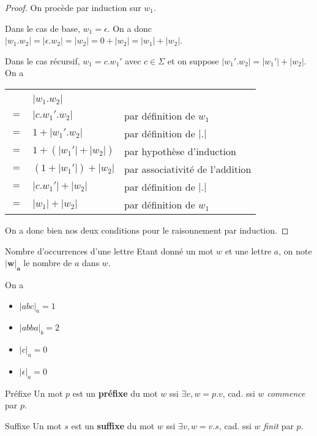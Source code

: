 \begin{proof}
On procède par induction sur $w_1$.

Dans le cas de base, $w_1 = \epsilon$. On a donc $|w_1.w_2| = |\epsilon.w_2| = |w_2| = 0 + |w_2| = |w_1| + |w_2|$.

Dans le cas récursif, $w_1 = c.w_1'$ avec $c \in \Sigma$ et on suppose $|w_1'.w_2| = |w_1'| + |w_2|$. On a
\begin{tabular}{cll}
&&\\
& $|w_1.w_2|$ & \\
$=$ & $|c.w_1'.w_2|$ & par définition de $w_1$ \\
$=$&  $1 + |w_1'.w_2|$ & par définition de $|.|$ \\
$=$& $1 + (|w_1'| + |w_2|)$ & par hypothèse d'induction \\
$=$& $(1 + |w_1'|) + |w_2|$ & par associativité de l'addition \\
$=$& $|c.w_1'| + |w_2|$ & par définition de $|.|$ \\
$=$& $|w_1| + |w_2|$ & par définition de $w_1$
\end{tabular}

On a donc bien nos deux conditions pour le raisonnement par induction.
\end{proof}


\begin{definition}{Nombre d'occurrences d'une lettre}{}
Etant donné un mot $w$ et une lettre $a$, on note $\mathbf{|w|_a}$ le nombre de $a$ dans $w$.
\end{definition}

\begin{example}
On a 
\begin{itemize}
    \item $|abc|_a = 1$
    \item $|abba|_b = 2$
    \item $|c|_a = 0$
    \item $|\epsilon|_a = 0$
\end{itemize}
\end{example}

\begin{definition}{Préfixe}{}
Un mot $p$ est un \textbf{préfixe} du mot $w$ ssi $\exists v, w = p.v$, cad. ssi $w$ \textit{commence} par $p$.
\end{definition}

\begin{definition}{Suffixe}{}
Un mot $s$ est un \textbf{suffixe} du mot $w$ ssi $\exists v, w = v.s$, cad. ssi $w$ \textit{finit} par $p$.
\end{definition}


